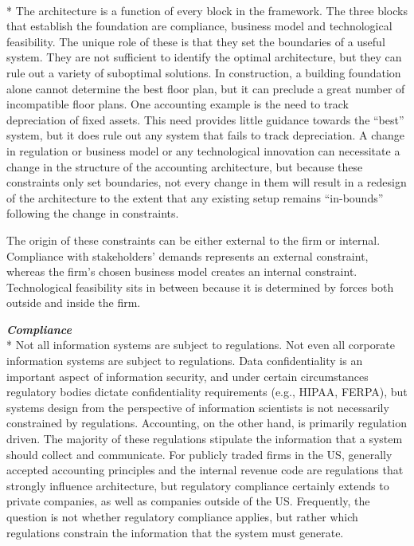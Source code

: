 \documentclass[12pt]{article}
\newcommand{\SubSection}[1]{\vspace{.15in}{\centering{}\normalsize{}\textbf{#1}}\\*\indent{}}
\newcommand{\SubSubSection}[1]{{\centering{}\normalsize{}\textbf{\emph{#1}}}\\*\indent{}}
\begin{document}
\SubSection{Foundation}
The architecture is a function of every block in the framework. The three blocks that establish the foundation are compliance, business model and technological feasibility. The unique role of these is that they set the boundaries of a useful system. They are not sufficient to identify the optimal architecture, but they can rule out a variety of suboptimal solutions. In construction, a building foundation alone cannot determine the best floor plan, but it can preclude a great number of incompatible floor plans. One accounting example is the need to track depreciation of fixed assets. This need provides little guidance towards the ``best'' system, but it does rule out any system that fails to track depreciation. A change in regulation or business model or any technological innovation can necessitate a change in the structure of the accounting architecture, but because these constraints only set boundaries, not every change in them will result in a redesign of the architecture to the extent that any existing setup remains ``in-bounds'' following the change in constraints.

The origin of these constraints can be either external to the firm or internal. Compliance with stakeholders' demands represents an external constraint, whereas the firm's chosen business model creates an internal constraint. Technological feasibility sits in between because it is determined by forces both outside and inside the firm.

\SubSubSection{Compliance}
Not all information systems are subject to regulations. Not even all corporate information systems are subject to regulations. Data confidentiality is an important aspect of information security, and under certain circumstances regulatory bodies dictate confidentiality requirements (e.g., HIPAA, FERPA), but systems design from the perspective of information scientists is not necessarily constrained by regulations. Accounting, on the other hand, is primarily regulation driven. The majority of these regulations stipulate the information that a system should collect and communicate. For publicly traded firms in the US, generally accepted accounting principles and the internal revenue code are regulations that strongly influence architecture, but regulatory compliance certainly extends to private companies, as well as companies outside of the US. Frequently, the question is not whether regulatory compliance applies, but rather which regulations constrain the information that the system must generate.
\end{document}
